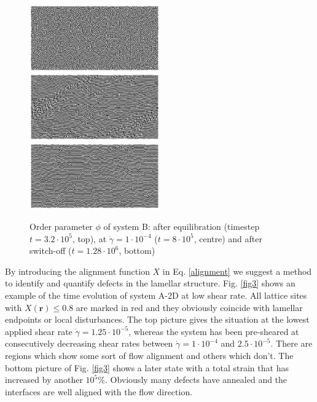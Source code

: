 \documentclass[8.5pt,twoside,twocolumn]{article}
\newcommand{\e}[1]{\cdot10^{#1}}
\newcommand{\gd}{\dot{\gamma}}
\begin{document}
\begin{figure}[htp]
\centering
\includegraphics[angle=0,width=0.5\textwidth]{phi_run707_320.jpg}\\
\includegraphics[angle=0,width=0.5\textwidth]{phi_run710_800.jpg}\\
\includegraphics[angle=0,width=0.5\textwidth]{phi_run765_1280.jpg}
\caption{Order parameter $\phi$ of system B: after equilibration (timestep $t=3.2\e{5}$, top), at $\dot{\gamma}=1\cdot10^{-4}$ ($t=8\e{5}$, centre) and after switch-off ($t=1.28\e{6}$, bottom)}
\label{fig2}
\end{figure}

By introducing the alignment function $X$ in Eq. \ref{alignment} we suggest a method to identify and quantify defects in the lamellar structure.
Fig. \ref{fig3} shows an example of the time evolution of system A-2D at low shear rate.
All lattice sites with $X({\mathbf r})\le0.8$ are marked in red and they obviously coincide with lamellar endpoints or local disturbances.
The top picture gives the situation at the lowest applied shear rate $\dot{\gamma}=1.25\e{-5}$, whereas the system has been pre-sheared at consecutively decreasing shear rates between $\gd=1\e{-4}$ and $2.5\e{-5}$.
There are regions which show some sort of flow alignment and others which don't.
The bottom picture of Fig. \ref{fig3} shows a later state with a total strain that has increased by another $10^{5}\%$. 
Obviously many defects have annealed and the interfaces are well aligned with the flow direction.
\end{document}
